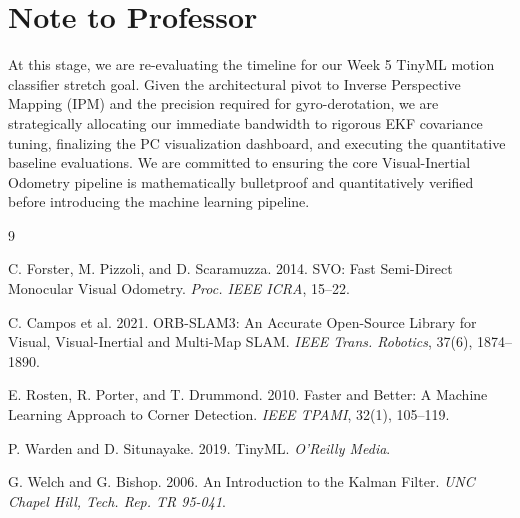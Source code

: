 \documentclass[sigconf,nonacm]{acmart}
\begin{document}
\section{Note to Professor}
At this stage, we are re-evaluating the timeline for our Week 5 TinyML motion classifier stretch goal. Given the architectural pivot to Inverse Perspective Mapping (IPM) and the precision required for gyro-derotation, we are strategically allocating our immediate bandwidth to rigorous EKF covariance tuning, finalizing the PC visualization dashboard, and executing the quantitative baseline evaluations. We are committed to ensuring the core Visual-Inertial Odometry pipeline is mathematically bulletproof and quantitatively verified before introducing the machine learning pipeline.
	
	
	\begin{thebibliography}{9}
		
		C. Forster, M. Pizzoli, and D. Scaramuzza. 2014.
		\newblock SVO: Fast Semi-Direct Monocular Visual Odometry.
		\newblock \emph{Proc. IEEE ICRA}, 15--22.
		
		C. Campos et al. 2021.
		\newblock ORB-SLAM3: An Accurate Open-Source Library for Visual, Visual-Inertial and Multi-Map SLAM.
		\newblock \emph{IEEE Trans. Robotics}, 37(6), 1874--1890.
		
		E. Rosten, R. Porter, and T. Drummond. 2010.
		\newblock Faster and Better: A Machine Learning Approach to Corner Detection.
		\newblock \emph{IEEE TPAMI}, 32(1), 105--119.
		
		P. Warden and D. Situnayake. 2019.
		\newblock TinyML.
		\newblock \emph{O'Reilly Media}.
		
		G. Welch and G. Bishop. 2006.
		\newblock An Introduction to the Kalman Filter.
		\newblock \emph{UNC Chapel Hill, Tech. Rep. TR 95-041}.
		
	\end{thebibliography}
	
\end{document}
